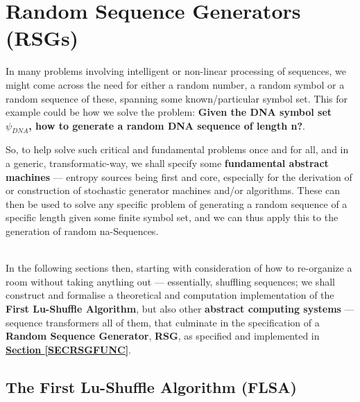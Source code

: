 \documentclass[a4paper, 18pt]{book} %
\begin{document}
\chapter{Random Sequence Generators (RSGs)}
\label{SECRSG}


In many problems involving intelligent or non-linear processing of sequences, we might come across the need for either a random number, a random symbol or a random sequence of these, spanning some known/particular symbol set. This for example could be how we solve the problem: \textbf{Given the DNA symbol set $\psi_{DNA}$, how to generate a random DNA sequence of length n?}.

So, to help solve such critical and fundamental problems once and for all, and in a generic, transformatic-way, we shall specify some \textbf{fundamental abstract machines} --- entropy sources being first and core, especially for the derivation of or construction of stochastic generator machines and/or algorithms. These can then be used to solve any specific problem of generating a random sequence of a specific length given some finite symbol set, and we can thus apply this to the generation of random na-Sequences.




\\


In the following sections then, starting with consideration of how to re-organize a room without taking anything out --- essentially, shuffling sequences; we shall construct and formalise a theoretical and computation implementation of  the \textbf{First Lu-Shuffle Algorithm}, but also other \textbf{abstract computing systems} --- sequence transformers all of them, that culminate in the specification of a \textbf{Random Sequence Generator}, \textbf{RSG}, as specified and implemented in \textbf{\hyperref[SECRSGFUNC]{Section \ref{SECRSGFUNC}}}.

\section{The First Lu-Shuffle Algorithm (FLSA)}
\end{document}
